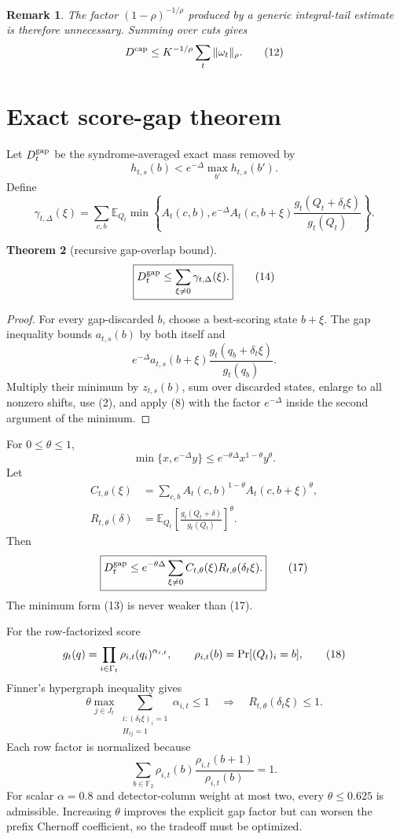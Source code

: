 \documentclass[11pt]{article}
\newtheorem{theorem}{Theorem}
\newtheorem{remark}[theorem]{Remark}
\newcommand{\F}{\mathbb F}
\newcommand{\E}{\mathbb E}
\newcommand{\Prb}{\mathop{\rm Pr}}
\newcommand{\1}{\mathbf 1}
\newcommand{\gaploss}{D_t^{\rm gap}}
\begin{document}
\begin{remark}
The factor \((1-\rho)^{-1/\rho}\) produced by a generic integral-tail
estimate is therefore unnecessary.  Summing over cuts gives
\[
  D^{\rm cap}\le K^{-1/\rho}\sum_t\|\omega_t\|_\rho.
  \tag{12}
\]
\end{remark}

\section{Exact score-gap theorem}

Let \(\gaploss\) be the syndrome-averaged exact mass removed by
\[
 h_{t,s}(b)<e^{-\Delta}\max_{b'}h_{t,s}(b').
\]
Define
\[
\boxed{
 \gamma_{t,\Delta}(\xi)=
 \sum_{c,b}\E_{Q_t}
 \min\left\{
 A_t(c,b),
 e^{-\Delta}A_t(c,b+\xi)
 \frac{g_t(Q_t+\delta_t\xi)}{g_t(Q_t)}
 \right\}.}
 \tag{13}
\]

\begin{theorem}[recursive gap-overlap bound]
\[
\boxed{
  \gaploss\le\sum_{\xi\ne0}\gamma_{t,\Delta}(\xi).}
  \tag{14}
\]
\end{theorem}

\begin{proof}
For every gap-discarded \(b\), choose a best-scoring state \(b+\xi\).  The
gap inequality bounds \(a_{t,s}(b)\) by both itself and
\[
 e^{-\Delta}a_{t,s}(b+\xi)
 \frac{g_t(q_b+\delta_t\xi)}{g_t(q_b)}.
\]
Multiply their minimum by \(z_{t,s}(b)\), sum over discarded states, enlarge
to all nonzero shifts, use (2), and apply (8) with the factor
\(e^{-\Delta}\) inside the second argument of the minimum.
\end{proof}

For \(0\le\theta\le1\),
\[
  \min\{x,e^{-\Delta}y\}
  \le e^{-\theta\Delta}x^{1-\theta}y^\theta.
  \tag{15}
\]
Let
\[
\begin{split}
 C_{t,\theta}(\xi)
 &=\sum_{c,b}
 A_t(c,b)^{1-\theta}A_t(c,b+\xi)^\theta,\\
 R_{t,\theta}(\delta)
 &=\E_{Q_t}
 \left[\frac{g_t(Q_t+\delta)}{g_t(Q_t)}\right]^\theta.
\end{split}
\tag{16}
\]
Then
\[
\boxed{
 \gaploss\le
 e^{-\theta\Delta}\sum_{\xi\ne0}
 C_{t,\theta}(\xi)R_{t,\theta}(\delta_t\xi).}
 \tag{17}
\]
The minimum form (13) is never weaker than (17).

For the row-factorized score
\[
 g_t(q)=\prod_{i\in\Gamma_t}\rho_{i,t}(q_i)^{\alpha_{i,t}},
 \qquad
 \rho_{i,t}(b)=\Prb[(Q_t)_i=b],
 \tag{18}
\]
Finner's hypergraph inequality gives
\[
\boxed{
 \theta\max_{j\in J_t}
 \sum_{\substack{i:(\delta_t\xi)_i=1\\H_{ij}=1}}
 \alpha_{i,t}\le1
 \quad\Longrightarrow\quad
 R_{t,\theta}(\delta_t\xi)\le1.}
 \tag{19}
\]
Each row factor is normalized because
\[
 \sum_{b\in\F_2}\rho_{i,t}(b)
 \frac{\rho_{i,t}(b+1)}{\rho_{i,t}(b)}=1.
\]
For scalar \(\alpha=0.8\) and detector-column weight at most two, every
\(\theta\le0.625\) is admissible.  Increasing \(\theta\) improves the explicit
gap factor but can worsen the prefix Chernoff coefficient, so the tradeoff
must be optimized.
\end{document}
